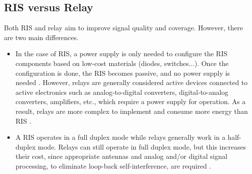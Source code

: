 \documentclass[conference]{IEEEtran}
\begin{document}
\subsection{RIS versus Relay}
Both RIS and relay aim to improve signal quality and coverage. However, there are two main differences.
\begin{itemize}
    \item In the case of RIS, a power supply is only needed to configure the RIS components based on low-cost materials (diodes, switches...). Once the configuration is done, the RIS becomes passive, and no power supply is needed \cite{bjornson2020reconfigurable}. However, relays are generally considered active devices connected to active electronics such as analog-to-digital converters, digital-to-analog converters, amplifiers, etc., which require a power supply for operation. As a result, relays are more complex to implement and consume more energy than RIS \cite{9119122}.
    \item A RIS operates in a full duplex mode while  relays generally work in a half-duplex mode. Relays can still operate  in full duplex mode, but this increases their cost, since appropriate antennas and analog and/or digital signal processing, to eliminate loop-back self-interference, are required \cite{9119122}.

\end{itemize}
\end{document}
